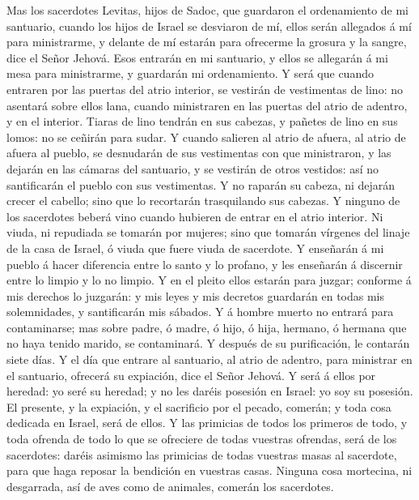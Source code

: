 Mas los sacerdotes Levitas, hijos de Sadoc, que guardaron el
ordenamiento de mi santuario, cuando los hijos de Israel se desviaron de
mí, ellos serán allegados á mí para ministrarme, y delante de mí estarán
para ofrecerme la grosura y la sangre, dice el Señor Jehová.
 Esos entrarán en mi santuario, y ellos se allegarán á mi
mesa para ministrarme, y guardarán mi ordenamiento.  Y
será que cuando entraren por las puertas del atrio interior, se vestirán
de vestimentas de lino: no asentará sobre ellos lana, cuando ministraren
en las puertas del atrio de adentro, y en el interior. 
Tiaras de lino tendrán en sus cabezas, y pañetes de lino en sus lomos:
no se ceñirán para sudar.  Y cuando salieren al atrio de
afuera, al atrio de afuera al pueblo, se desnudarán de sus vestimentas
con que ministraron, y las dejarán en las cámaras del santuario, y se
vestirán de otros vestidos: así no santificarán el pueblo con sus
vestimentas.  Y no raparán su cabeza, ni dejarán crecer
el cabello; sino que lo recortarán trasquilando sus cabezas.
 Y ninguno de los sacerdotes beberá vino cuando hubieren
de entrar en el atrio interior.  Ni viuda, ni repudiada
se tomarán por mujeres; sino que tomarán vírgenes del linaje de la casa
de Israel, ó viuda que fuere viuda de sacerdote.  Y
enseñarán á mi pueblo á hacer diferencia entre lo santo y lo profano, y
les enseñarán á discernir entre lo limpio y lo no limpio.
 Y en el pleito ellos estarán para juzgar; conforme á mis
derechos lo juzgarán: y mis leyes y mis decretos guardarán en todas mis
solemnidades, y santificarán mis sábados.  Y á hombre
muerto no entrará para contaminarse; mas sobre padre, ó madre, ó hijo, ó
hija, hermano, ó hermana que no haya tenido marido, se contaminará.
 Y después de su purificación, le contarán siete días.
 Y el día que entrare al santuario, al atrio de adentro,
para ministrar en el santuario, ofrecerá su expiación, dice el Señor
Jehová.  Y será á ellos por heredad: yo seré su heredad;
y no les daréis posesión en Israel: yo soy su posesión. 
El presente, y la expiación, y el sacrificio por el pecado, comerán; y
toda cosa dedicada en Israel, será de ellos.  Y las
primicias de todos los primeros de todo, y toda ofrenda de todo lo que
se ofreciere de todas vuestras ofrendas, será de los sacerdotes: daréis
asimismo las primicias de todas vuestras masas al sacerdote, para que
haga reposar la bendición en vuestras casas.  Ninguna
cosa mortecina, ni desgarrada, así de aves como de animales, comerán los
sacerdotes.

